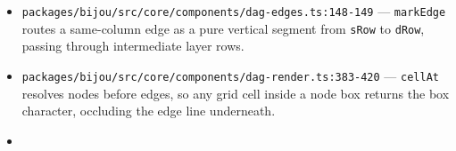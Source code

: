 \begin{itemize}
\tightlist
\item
  \texttt{p\allowbreak{}a\allowbreak{}c\allowbreak{}k\allowbreak{}a\allowbreak{}g\allowbreak{}e\allowbreak{}s\allowbreak{}/\allowbreak{}b\allowbreak{}i\allowbreak{}j\allowbreak{}o\allowbreak{}u\allowbreak{}/\allowbreak{}s\allowbreak{}r\allowbreak{}c\allowbreak{}/\allowbreak{}c\allowbreak{}o\allowbreak{}r\allowbreak{}e\allowbreak{}/\allowbreak{}c\allowbreak{}o\allowbreak{}m\allowbreak{}p\allowbreak{}o\allowbreak{}n\allowbreak{}e\allowbreak{}n\allowbreak{}t\allowbreak{}s\allowbreak{}/\allowbreak{}d\allowbreak{}a\allowbreak{}g\allowbreak{}-\allowbreak{}e\allowbreak{}d\allowbreak{}g\allowbreak{}e\allowbreak{}s\allowbreak{}.\allowbreak{}t\allowbreak{}s\allowbreak{}:\allowbreak{}1\allowbreak{}4\allowbreak{}8\allowbreak{}-\allowbreak{}1\allowbreak{}4\allowbreak{}9} --- \texttt{m\allowbreak{}a\allowbreak{}r\allowbreak{}k\allowbreak{}E\allowbreak{}d\allowbreak{}g\allowbreak{}e} routes a same-column edge as a pure vertical segment from \texttt{s\allowbreak{}R\allowbreak{}o\allowbreak{}w} to \texttt{d\allowbreak{}R\allowbreak{}o\allowbreak{}w}, passing through intermediate layer rows.
\item
  \texttt{p\allowbreak{}a\allowbreak{}c\allowbreak{}k\allowbreak{}a\allowbreak{}g\allowbreak{}e\allowbreak{}s\allowbreak{}/\allowbreak{}b\allowbreak{}i\allowbreak{}j\allowbreak{}o\allowbreak{}u\allowbreak{}/\allowbreak{}s\allowbreak{}r\allowbreak{}c\allowbreak{}/\allowbreak{}c\allowbreak{}o\allowbreak{}r\allowbreak{}e\allowbreak{}/\allowbreak{}c\allowbreak{}o\allowbreak{}m\allowbreak{}p\allowbreak{}o\allowbreak{}n\allowbreak{}e\allowbreak{}n\allowbreak{}t\allowbreak{}s\allowbreak{}/\allowbreak{}d\allowbreak{}a\allowbreak{}g\allowbreak{}-\allowbreak{}r\allowbreak{}e\allowbreak{}n\allowbreak{}d\allowbreak{}e\allowbreak{}r\allowbreak{}.\allowbreak{}t\allowbreak{}s\allowbreak{}:\allowbreak{}3\allowbreak{}8\allowbreak{}3\allowbreak{}-\allowbreak{}4\allowbreak{}2\allowbreak{}0} --- \texttt{c\allowbreak{}e\allowbreak{}l\allowbreak{}l\allowbreak{}A\allowbreak{}t} resolves nodes before edges, so any grid cell inside a node box returns the box character, occluding the edge line underneath.
\item

\end{itemize}
